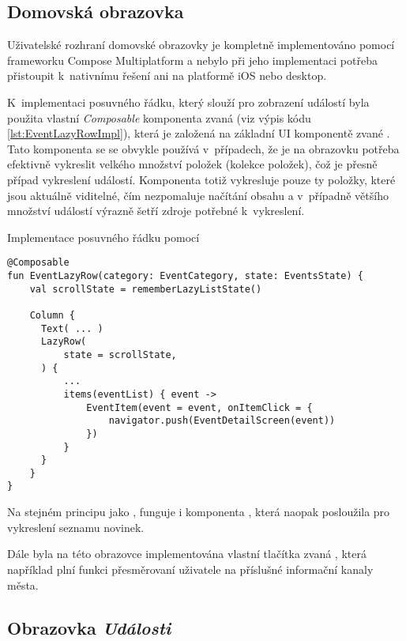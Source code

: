 \subsection{Domovská obrazovka}
Uživatelské rozhraní domovské obrazovky je kompletně implementováno pomocí frameworku Compose Multiplatform a nebylo při jeho implementaci potřeba
přistoupit k~nativnímu řešení ani na platformě iOS nebo desktop.

K~implementaci posuvného řádku, který slouží pro zobrazení událostí byla použita vlastní \textit{Composable} komponenta zvaná  
(viz výpis kódu \ref{lst:EventLazyRowImpl}),
která je založená na základní UI komponentě zvané . Tato komponenta se se obvykle používá v~případech, že je na obrazovku potřeba efektivně 
vykreslit velkého množství položek (kolekce položek), čož je přesně případ vykreslení událostí. Komponenta  totiž vykresluje pouze ty položky,
které jsou aktuálně viditelné, čím nezpomaluje načítání obsahu a v~případně většího množství událostí výrazně šetří zdroje potřebné k~vykreslení.

\begin{listing}[H]
\caption{Implementace posuvného řádku pomocí }\label{lst:EventLazyRowImpl}
\begin{verbatim}
@Composable
fun EventLazyRow(category: EventCategory, state: EventsState) {
    val scrollState = rememberLazyListState()

    Column {
      Text( ... )
      LazyRow(
          state = scrollState,
      ) {
          ...
          items(eventList) { event ->
              EventItem(event = event, onItemClick = {
                  navigator.push(EventDetailScreen(event))
              })
          }
      }
    }
}  
\end{verbatim}
\end{listing}

Na stejném principu jako , funguje i komponenta , která naopak posloužila pro vykreslení seznamu novinek.

Dále byla na této obrazovce implementována vlastní tlačítka zvaná , která například plní funkci přesměrovaní uživatele na 
příslušné informační kanaly města.  



\subsection{Obrazovka \textit{Události}}

